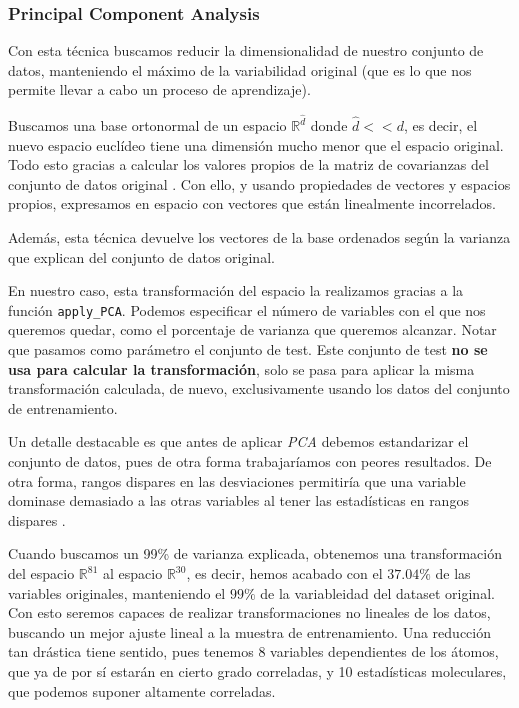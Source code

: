 \documentclass[11pt]{article}
\begin{document}
\subsubsection{Principal Component Analysis}

Con esta técnica buscamos reducir la dimensionalidad de nuestro conjunto de datos, manteniendo el máximo de la variabilidad original (que es lo que nos permite llevar a cabo un proceso de aprendizaje).

Buscamos una base ortonormal de un espacio $\mathbb{R}^{\hat{d}}$ donde $\hat{d} << d$, es decir, el nuevo espacio euclídeo tiene una dimensión mucho menor que el espacio original. Todo esto gracias a calcular los valores propios de la matriz de covarianzas del conjunto de datos original \cite{pca_wikipedia:online} \cite{pca_article:online}. Con ello, y usando propiedades de vectores y espacios propios, expresamos en espacio con vectores que están linealmente incorrelados.

Además, esta técnica devuelve los vectores de la base ordenados según la varianza que explican del conjunto de datos original.

En nuestro caso, esta transformación del espacio la realizamos gracias a la función \lstinline{apply_PCA}. Podemos especificar el número de variables con el que nos queremos quedar, como el porcentaje de varianza que queremos alcanzar. Notar que pasamos como parámetro el conjunto de test. Este conjunto de test \textbf{no se usa para calcular la transformación}, solo se pasa para aplicar la misma transformación calculada, de nuevo, exclusivamente usando los datos del conjunto de entrenamiento.

Un detalle destacable es que antes de aplicar \emph{PCA} debemos estandarizar el conjunto de datos, pues de otra forma trabajaríamos con peores resultados. De otra forma, rangos dispares en las desviaciones permitiría que una variable dominase demasiado a las otras variables al tener las estadísticas en rangos dispares \cite{normalize_before_pca:online}.

Cuando buscamos un 99\% de varianza explicada, obtenemos una transformación del espacio $\mathbb{R}^{81}$ al espacio $\mathbb{R}^{30}$, es decir, hemos acabado con el $37.04\%$ de las variables originales, manteniendo el $99\%$ de la variableidad del dataset original. Con esto seremos capaces de realizar transformaciones no lineales de los datos, buscando un mejor ajuste lineal a la muestra de entrenamiento. Una reducción tan drástica tiene sentido, pues tenemos 8 variables dependientes de los átomos, que ya de por sí estarán en cierto grado correladas, y 10 estadísticas moleculares, que podemos suponer altamente correladas.
\end{document}
